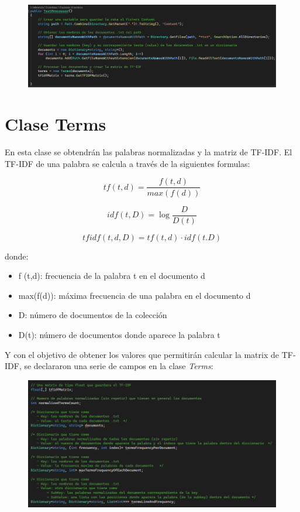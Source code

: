 \documentclass[a4paper,12pt]{report}
\begin{document}
\begin{figure}[h]
    \includegraphics*[width=16cm]{fotos/02 - Constructor de la TextProcessor.png}
\end{figure}

\section*{Clase Terms}

En esta clase se obtendrán las palabras normalizadas y la matriz de TF-IDF. El TF-IDF de una palabra
se calcula a través de la siguientes formulas:

\begin{equation}
    tf(t,d) = \frac{f(t,d)}{max(f(d))}
\end{equation}

\begin{equation}
    idf(t,D) = \log\frac{D}{D(t)}
\end{equation}

\begin{equation}
    tfidf(t,d,D) = tf(t,d) \cdot idf(t.D)
\end{equation}

donde:
\begin{itemize}
    \item f (t,d): frecuencia de la palabra t en el documento d 
    \item max(f(d)): máxima frecuencia de una palabra en el documento d
    \item D: número de documentos de la colección 
    \item D(t): número de documentos donde aparece la palabra t
\end{itemize}

\newpage

Y con el objetivo de obtener los valores que permitirán calcular la matrix de TF-IDF, se declararon
una serie de campos en la clase \textit{Terms}:

\begin{figure}[h]
    \includegraphics*[width=16cm]{fotos/03 - Campos de la clase Terms.png}
\end{figure}
\end{document}
